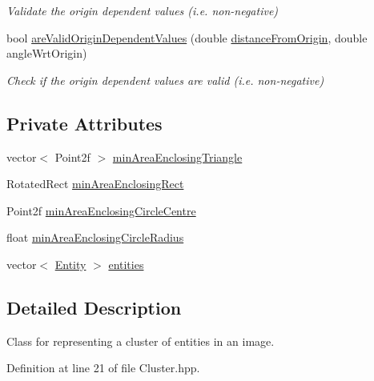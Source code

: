\begin{DoxyCompactItemize}
\begin{DoxyCompactList}\small\item\em \-Validate the origin dependent values (i.\-e. non-\/negative) \end{DoxyCompactList}\item 
bool \hyperlink{classmultiscale_1_1analysis_1_1Cluster_a05e8593354fabd5c1ca18b6a2b19096e}{are\-Valid\-Origin\-Dependent\-Values} (double \hyperlink{classmultiscale_1_1analysis_1_1SpatialEntityPseudo3D_a056f67b90ed41c0e6dc4df31b71ad906}{distance\-From\-Origin}, double angle\-Wrt\-Origin)
\begin{DoxyCompactList}\small\item\em \-Check if the origin dependent values are valid (i.\-e. non-\/negative) \end{DoxyCompactList}\end{DoxyCompactItemize}
\subsection*{\-Private \-Attributes}
\begin{DoxyCompactItemize}
\item 
vector$<$ \-Point2f $>$ \hyperlink{classmultiscale_1_1analysis_1_1Cluster_a7678d48581202c3ecc3f1283a1730dfa}{min\-Area\-Enclosing\-Triangle}
\item 
\-Rotated\-Rect \hyperlink{classmultiscale_1_1analysis_1_1Cluster_aeb032303a79c6bd43385fcaad9c50742}{min\-Area\-Enclosing\-Rect}
\item 
\-Point2f \hyperlink{classmultiscale_1_1analysis_1_1Cluster_a47e672060b4025dcd07ebb9c5fd99f0c}{min\-Area\-Enclosing\-Circle\-Centre}
\item 
float \hyperlink{classmultiscale_1_1analysis_1_1Cluster_a070994481884a4c7f5aa4879ce7b0568}{min\-Area\-Enclosing\-Circle\-Radius}
\item 
vector$<$ \hyperlink{classmultiscale_1_1analysis_1_1Entity}{\-Entity} $>$ \hyperlink{classmultiscale_1_1analysis_1_1Cluster_a820298479651328fb79d92a65f7923d6}{entities}
\end{DoxyCompactItemize}


\subsection{\-Detailed \-Description}
\-Class for representing a cluster of entities in an image. 

\-Definition at line 21 of file \-Cluster.\-hpp.



